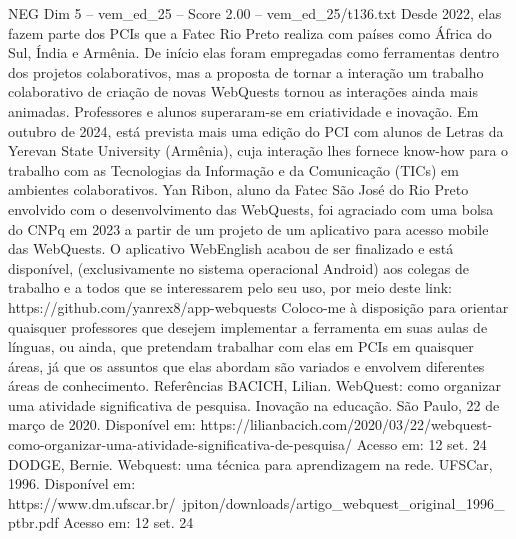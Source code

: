\begin{textsample}{NEG Dim 5 – vem\_ed\_25 – Score 2.00 – vem\_ed\_25/t136.txt}
Desde 2022, elas fazem parte dos PCIs que a Fatec Rio Preto realiza com países como África do Sul, Índia e Armênia.
De início elas foram empregadas como ferramentas dentro dos projetos colaborativos, mas a proposta de tornar a interação um trabalho colaborativo de criação de novas WebQuests tornou as interações ainda mais animadas.
Professores e alunos superaram-se em criatividade e inovação.
Em outubro de 2024, está prevista mais uma edição do PCI com alunos de Letras da Yerevan State University (Armênia), cuja interação lhes fornece know-how para o trabalho com as Tecnologias da Informação e da Comunicação (TICs) em ambientes colaborativos.
Yan Ribon, aluno da Fatec São José do Rio Preto envolvido com o desenvolvimento das WebQuests, foi agraciado com uma bolsa do CNPq em 2023 a partir de um projeto de um aplicativo para acesso mobile das WebQuests.
O aplicativo WebEnglish acabou de ser finalizado e está disponível, (exclusivamente no sistema operacional Android) aos colegas de trabalho e a todos que se interessarem pelo seu uso, por meio deste link: https://github.com/yanrex8/app-webquests Coloco-me à disposição para orientar quaisquer professores que desejem implementar a ferramenta em suas aulas de línguas, ou ainda, que pretendam trabalhar com elas em PCIs em quaisquer áreas, já que os assuntos que elas abordam são variados e envolvem diferentes áreas de conhecimento.
Referências BACICH, Lilian.
WebQuest: como organizar uma atividade significativa de pesquisa.
Inovação na educação.
São Paulo, 22 de março de 2020.
Disponível em: https://lilianbacich.com/2020/03/22/webquest-como-organizar-uma-atividade-significativa-de-pesquisa/ Acesso em: 12 set. 24 DODGE, Bernie.
Webquest: uma técnica para aprendizagem na rede.
UFSCar, 1996.
Disponível em: https://www.dm.ufscar.br/~jpiton/downloads/artigo\_webquest\_original\_1996\_ptbr.pdf Acesso em: 12 set. 24

\end{textsample}
